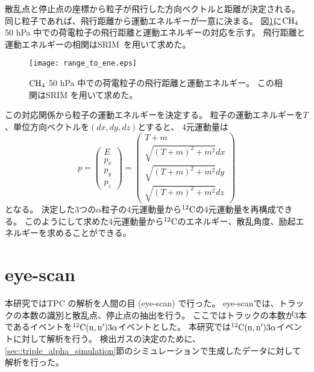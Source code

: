 \documentclass[../master]{subfiles}
\begin{document}
散乱点と停止点の座標から粒子が飛行した方向ベクトルと距離が決定される。
同じ粒子であれば、飛行距離から運動エネルギーが一意に決まる。
図\ref{fig::range_to_ene_alpha}に$\rm CH_{4}$ 50 hPa 中での荷電粒子の飛行距離と運動エネルギーの対応を示す。
飛行距離と運動エネルギーの相関はSRIM~\cite{srim}を用いて求めた。
\begin{figure}
  \centering
  \texttt{[image: range\_to\_ene.eps]}
  \caption[$\rm CH_{4}$ 50 hPa 中での荷電粒子の飛行距離と運動エネルギー。]
          {$\rm CH_{4}$ 50 hPa 中での荷電粒子の飛行距離と運動エネルギー。
            この相関はSRIM を用いて求めた。
          }
  \label{fig::range_to_ene_alpha}
\end{figure}
この対応関係から粒子の運動エネルギーを決定する。
粒子の運動エネルギーを$T$、単位方向ベクトルを$(dx, dy, dz)$とすると、
4元運動量は
\begin{equation}
  p =
  \begin{pmatrix}
    E \\ p_{x} \\ p_{y} \\ p_{z}
  \end{pmatrix}
  =
  \begin{pmatrix}
    T + m \\ \sqrt{(T+m)^2 + m^2} dx \\ \sqrt{(T+m)^2 + m^2} dy \\ \sqrt{(T+m)^2 + m^2} dz
  \end{pmatrix}
  \label{eq::momentum_vector}
\end{equation}
となる。
決定した3つの$\alpha$粒子の4元運動量から${}^{12}{\rm C}$の4元運動量を再構成できる。
このようにして求めた4元運動量から${}^{12}{\rm C}$のエネルギー、散乱角度、励起エネルギーを求めることができる。


\section{eye-scan}
本研究ではTPC の解析を人間の目 (eye-scan) で行った。
eye-scanでは、トラックの本数の識別と散乱点、停止点の抽出を行う。
ここではトラックの本数が3本であるイベントを${}^{12}{\rm C}({\rm n},{\rm n}')3\alpha$イベントとした。
本研究では${}^{12}{\rm C}({\rm n},{\rm n}')3\alpha$イベントに対して解析を行う。
検出ガスの決定のために、\ref{sec::triple_alpha_simulation}節のシミュレーションで生成したデータに対して解析を行った。
\end{document}
